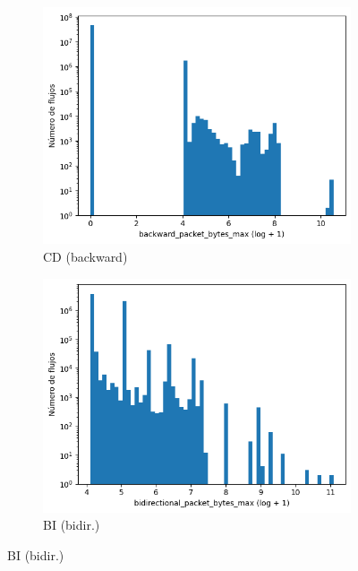 \begin{figure}[H]
\begin{subfigure}[b]{0.26\textwidth}
        \includegraphics[width=\textwidth]{media/packet_pincer_cicddos/backward_packet_bytes_max_log_x_log_y.png}
        \caption{CD (backward)} \label{fig:packet_pincer_packet_bytes_max_backward}
    \end{subfigure}
    \hfill
    \begin{subfigure}[b]{0.26\textwidth}
        \centering
        \includegraphics[width=\linewidth]{media/packet_pincer_botiot/bidirectional_packet_bytes_max_log_x_log_y.png}
        \caption{BI (bidir.)}

\end{subfigure}
\end{figure}
